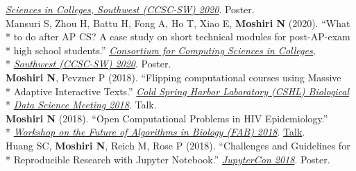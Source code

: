 \documentclass[margin,line]{res}
\begin{document}
\begin{resume}
\hspace*{8mm} \href{http://ccsc.org/southwestern/2020/index.php}{\textit{Sciences in Colleges, Southwest (CCSC-SW) 2020}}. Poster.\\
\hspace*{4mm} Mansuri S, Zhou H, Battu H, Fong A, Ho T, Xiao E, \textbf{Moshiri N} (2020). ``What\\*
\hspace*{9.5mm} to do after AP CS? A case study on short technical modules for post-AP-exam\\*
\hspace*{9.5mm} high school students.'' \href{http://ccsc.org/southwestern/2020/index.php}{\textit{Consortium for Computing Sciences in Colleges,}}\\*\vspace{2mm}
\hspace*{8mm} \href{http://ccsc.org/southwestern/2020/index.php}{\textit{Southwest (CCSC-SW) 2020}}. Poster.\\
\hspace*{4mm} \textbf{Moshiri N}, Pevzner P (2018). ``Flipping computational courses using Massive\\*
\hspace*{9.5mm} Adaptive Interactive Texts.'' \href{http://meetings.cshl.edu/meetings.aspx?meet=DATA&year=18}{\textit{Cold Spring Harbor Laboratory (CSHL) Biological}}\\*\vspace{2mm}
\hspace*{8mm} \href{http://meetings.cshl.edu/meetings.aspx?meet=DATA&year=18}{\textit{Data Science Meeting 2018}}. Talk.\\
\hspace*{4mm} \textbf{Moshiri N} (2018). ``Open Computational Problems in HIV Epidemiology.''\\*\vspace{2mm}
\hspace*{8mm} \href{http://fab2018.cbd.cmu.edu/}{\textit{Workshop on the Future of Algorithms in Biology (FAB) 2018}}. \href{https://youtu.be/ENKBbV_30kk}{Talk}.\\
\hspace*{4mm} Huang SC, \textbf{Moshiri N}, Reich M, Rose P (2018). ``Challenges and Guidelines for\\*\vspace{2mm}
\hspace*{8mm} Reproducible Research with Jupyter Notebook.'' \href{https://conferences.oreilly.com/jupyter/jup-ny}{\textit{JupyterCon 2018}}. Poster.\\

\end{resume}
\end{document}
